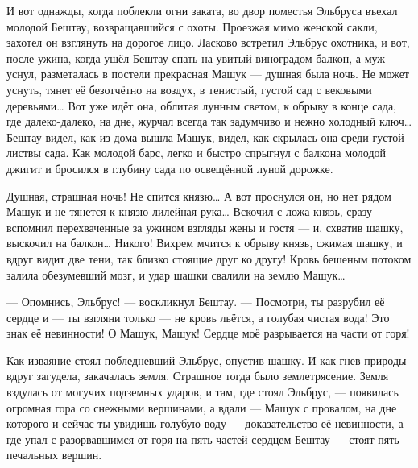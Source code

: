 И вот однажды, когда поблекли огни заката, во двор поместья Эльбруса въехал
молодой Бештау, возвращавшийся с охоты. Проезжая мимо женской сакли,
захотел он взглянуть на дорогое лицо. Ласково встретил Эльбрус охотника, и
вот, после ужина, когда ушёл Бештау спать на увитый виноградом балкон, а
муж уснул, разметалась в постели прекрасная Машук — душная была ночь. Не
может уснуть, тянет её безотчётно на воздух, в тенистый, густой сад с
вековыми деревьями… Вот уже идёт она, облитая лунным светом, к обрыву в
конце сада, где далеко-далеко, на дне, журчал всегда так задумчиво и нежно
холодный ключ… Бештау видел, как из дома вышла Машук, видел, как скрылась
она среди густой листвы сада. Как молодой барс, легко и быстро спрыгнул с
балкона молодой джигит и бросился в глубину сада по освещённой луной
дорожке.

Душная, страшная ночь! Не спится князю… А вот проснулся он, но нет рядом
Машук и не тянется к князю лилейная рука… Вскочил с ложа князь, сразу
вспомнил перехваченные за ужином взгляды жены и гостя — и, схватив шашку,
выскочил на балкон… Никого! Вихрем мчится к обрыву князь, сжимая шашку, и
вдруг видит две тени, так близко стоящие друг ко другу! Кровь бешеным
потоком залила обезумевший мозг, и удар шашки свалили на землю Машук…

— Опомнись, Эльбрус! — воскликнул Бештау. — Посмотри, ты разрубил её сердце
и — ты взгляни только — не кровь льётся, а голубая чистая вода! Это знак её
невинности! О Машук, Машук! Сердце моё разрывается на части от горя!

Как изваяние стоял побледневший Эльбрус, опустив шашку. И как гнев природы
вдруг загудела, закачалась земля. Страшное тогда было землетрясение. Земля
вздулась от могучих подземных ударов, и там, где стоял Эльбрус, — появилась
огромная гора со снежными вершинами, а вдали — Машук с провалом, на дне
которого и сейчас ты увидишь голубую воду — доказательство её невинности, а
где упал с разорвавшимся от горя на пять частей сердцем Бештау — стоят пять
печальных вершин.

\endgroup

